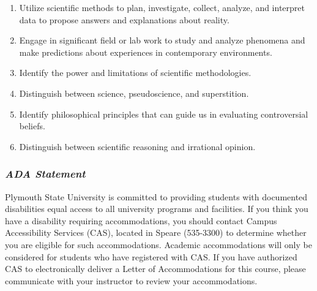 \documentclass[
]{article}
\providecommand{\tightlist}{%
  \setlength{\itemsep}{0pt}\setlength{\parskip}{0pt}}
\begin{document}
\begin{enumerate}
\def\labelenumi{\arabic{enumi}.}
\tightlist
\item
  Utilize scientific methods to plan, investigate, collect, analyze, and
  interpret data to propose answers and explanations about reality.
\item
  Engage in significant field or lab work to study and analyze phenomena
  and make predictions about experiences in contemporary environments.
\item
  Identify the power and limitations of scientific methodologies.
\item
  Distinguish between science, pseudoscience, and superstition.
\item
  Identify philosophical principles that can guide us in evaluating
  controversial beliefs.
\item
  Distinguish between scientific reasoning and irrational opinion.
\end{enumerate}

\hypertarget{ada-statement}{%
\subsubsection{\texorpdfstring{\emph{ADA
Statement}}{ADA Statement}}\label{ada-statement}}

Plymouth State University is committed to providing students with
documented disabilities equal access to all university programs and
facilities. If you think you have a disability requiring accommodations,
you should contact Campus Accessibility Services (CAS), located in
Speare (535-3300) to determine whether you are eligible for such
accommodations. Academic accommodations will only be considered for
students who have registered with CAS. If you have authorized CAS to
electronically deliver a Letter of Accommodations for this course,
please communicate with your instructor to review your accommodations.
\end{document}
